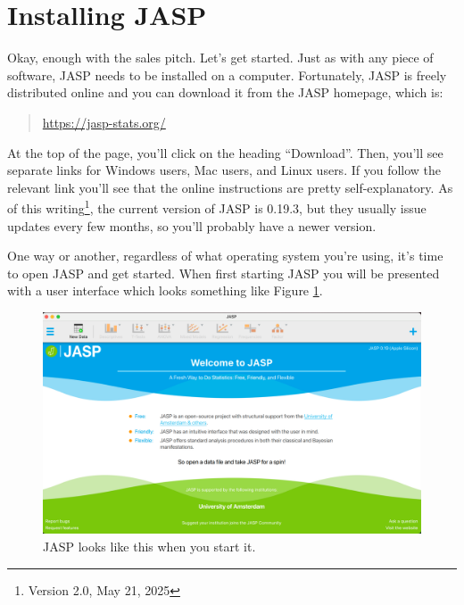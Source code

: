 \section{Installing JASP \label{sec:gettingjasp}}

Okay, enough with the sales pitch. Let's get started. Just as with any piece of software, JASP needs to be installed on a computer. Fortunately, JASP is freely distributed online and you can download it from the JASP homepage, which is:
\begin{quote}
\url{https://jasp-stats.org/}
\end{quote}
At the top of the page, you'll click on the heading ``Download''. Then, you'll see separate links for Windows users, Mac users, and Linux users. If you follow the relevant link you'll see that the online instructions are pretty self-explanatory. As of this writing\footnote{Version 2.0, May 21, 2025}, the current version of JASP is 0.19.3, but they usually issue updates every few months, so you'll probably have a newer version.


One way or another, regardless of what operating system you're using, it's time to open JASP and get started. When first starting JASP you will be presented with a user interface which looks something like Figure \ref{fig:startingjasp}.

\begin{figure}[ht]
\begin{center}
\includegraphics[width=14cm]{../img/introj/startingjasp.pdf}
\caption{JASP looks like this when you start it.}
\label{fig:startingjasp}
\end{center}
\end{figure}

